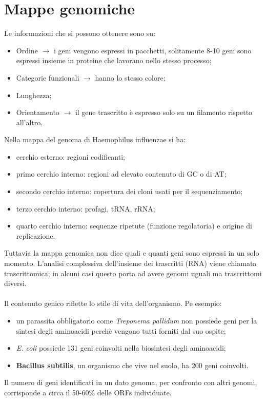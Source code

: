 \section{Mappe genomiche}
Le informazioni che si possono ottenere sono su: 
\begin{itemize}
    \item Ordine $\xrightarrow{}$ i geni vengono espressi in pacchetti, solitamente 8-10 geni sono espressi insieme in proteine che lavorano nello stesso processo;
    \item Categorie funzionali $\xrightarrow{}$ hanno lo stesso colore;
    \item Lunghezza;
    \item Orientamento $\xrightarrow{}$ il gene trascritto \`e espresso solo su un filamento rispetto all'altro.
\end{itemize}
Nella mappa del genoma di Haemophilus influenzae si ha:
\begin{itemize}
    \item cerchio esterno: regioni codificanti;
    \item primo cerchio interno: regioni ad elevato contenuto di GC o di AT;
    \item secondo cerchio interno: copertura dei cloni usati per il sequenziamento;
    \item terzo cerchio interno: profagi, tRNA, rRNA;
    \item quarto cerchio interno: sequenze ripetute (funzione regolatoria) e origine di replicazione.
\end{itemize}
Tuttavia la mappa genomica non dice quali e quanti geni sono espressi in un solo momento. L'analisi complessiva dell'insieme dei trascritti (RNA) viene chiamata trascrittomica; in alcuni casi questo porta ad avere genomi uguali ma trascrittomi diversi. 
\\\\Il contenuto genico riflette lo stile di vita dell'organismo. Pe esempio:
\begin{itemize}
    \item un parassita obbligatorio come \textit{Treponema pallidum} non possiede geni per la sintesi degli aminoacidi perch\`e vengono tutti forniti dal suo ospite;
    \item \textit{E. coli} possiede 131 geni coinvolti nella biosintesi degli aminoacidi;
    \item \textbf{Bacillus subtilis}, un organismo che vive nel suolo, ha 200 geni coinvolti.
\end{itemize}
Il numero di geni identificati in un dato genoma, per confronto con altri genomi, corrisponde a circa il 50-60$\%$ delle ORFs individuate.
